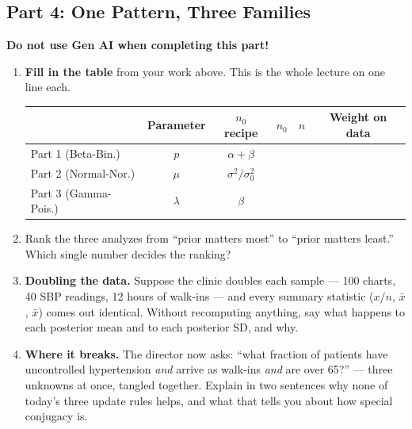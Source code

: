 \documentclass{article}
\newcommand{\blankline}[1]{\underline{\hspace{#1}}}
\begin{document}
\newpage

\subsection*{Part 4: One Pattern, Three Families}
\textbf{\color{red} Do not use Gen AI when completing this part!}

\begin{enumerate}[label={\bfseries (\Alph*)},itemsep=.6em]
	\item \textbf{Fill in the table} from your work above. This is the whole lecture on one line each.

	\vspace{0.3em}
	\begin{center}
	\renewcommand{\arraystretch}{1.5}
	{\small
	\begin{tabular}{lccccc}
	\toprule
	& \textbf{Parameter} & \textbf{$n_0$ recipe} & \textbf{$n_0$} & \textbf{$n$} & \textbf{Weight on data} \\
	\midrule
	Part 1 (Beta-Bin.)  & $p$       & $\alpha+\beta$          & \blankline{1.2cm} & \blankline{1.2cm} & \blankline{1.8cm} \\
	Part 2 (Normal-Nor.)& $\mu$     & $\sigma^2/\sigma_0^2$   & \blankline{1.2cm} & \blankline{1.2cm} & \blankline{1.8cm} \\
	Part 3 (Gamma-Pois.)& $\lambda$ & $\beta$                 & \blankline{1.2cm} & \blankline{1.2cm} & \blankline{1.8cm} \\
	\bottomrule
	\end{tabular}}
	\end{center}

	\item Rank the three analyzes from ``prior matters most'' to ``prior matters least.'' Which single number decides the ranking? \\[3em]

	\item \textbf{Doubling the data.} Suppose the clinic doubles each sample --- 100 charts, 40 SBP readings, 12 hours of walk-ins --- and every summary statistic ($x/n$, $\bar x$, $\bar x$) comes out identical. Without recomputing anything, say what happens to each posterior mean and to each posterior SD, and why. \\[5em]

	\item \textbf{Where it breaks.} The director now asks: ``what fraction of patients have uncontrolled hypertension \emph{and} arrive as walk-ins \emph{and} are over 65?'' --- three unknowns at once, tangled together. Explain in two sentences why none of today's three update rules helps, and what that tells you about how special conjugacy is. \\[5em]

\end{enumerate}
\end{document}
